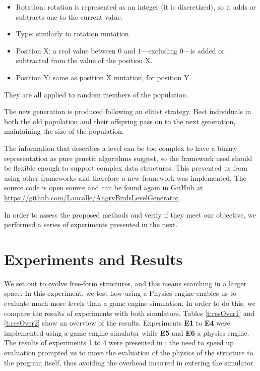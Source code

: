 \documentclass[a4paper,twoside]{article}
\begin{document}
\begin{itemize}
	\item Rotation: rotation is represented as an integer (it is discretized), 
	so it adds or 
	subtracts one 
	to the current value. %
	\item Type: similarly to rotation mutation.
	\item Position X: a real value between $0$ and $1$---excluding $0$---is 
	added or subtracted from the value of the position X.
	\item Position Y: same as position X mutation, for position Y.
\end{itemize}

They are all applied to random members of the population.

The new generation is produced following an elitist strategy. Best individuals in 
both the old population and their offspring pass on to the next generation, 
maintaining the size of the population.

The information that describes a level can be too complex to have a binary 
representation as pure genetic algorithms suggest, so the framework used should be 
flexible enough to support complex data structures. This prevented us from using other 
frameworks and therefore a new framework was implemented. The source code is open source and can be found again in GitHub at \url{https://github.com/Laucalle/AngryBirdsLevelGenerator}. %

In order to assess the proposed methods and verify if they meet our
objective, we performed a series of experiments presented in the next.

\section{Experiments and Results}\label{ch:res}

We set out to evolve free-form structures, and this means searching in a larger space. In this experiment, we test how using a Physics engine enables us to evaluate much more levels than a game engine simulation. In order to do this, we compare the results of experiments with both simulators. Tables \ref{t:resOver1} and \ref{t:resOver2} 
show an overview of the results. Experiments \textbf{E1} to \textbf{E4} were implemented 
using a game engine simulator while \textbf{E5} and \textbf{E6} a
physics engine. The results of experiments 1 to 4 were presented in
\cite{DBLP:conf/evoW/CalleGGV19anon}; the need to speed up evaluation
prompted us to move the evaluation of the physics of the structure to
the program itself, thus avoiding the overhead incurred in entering
the simulator.
\end{document}

